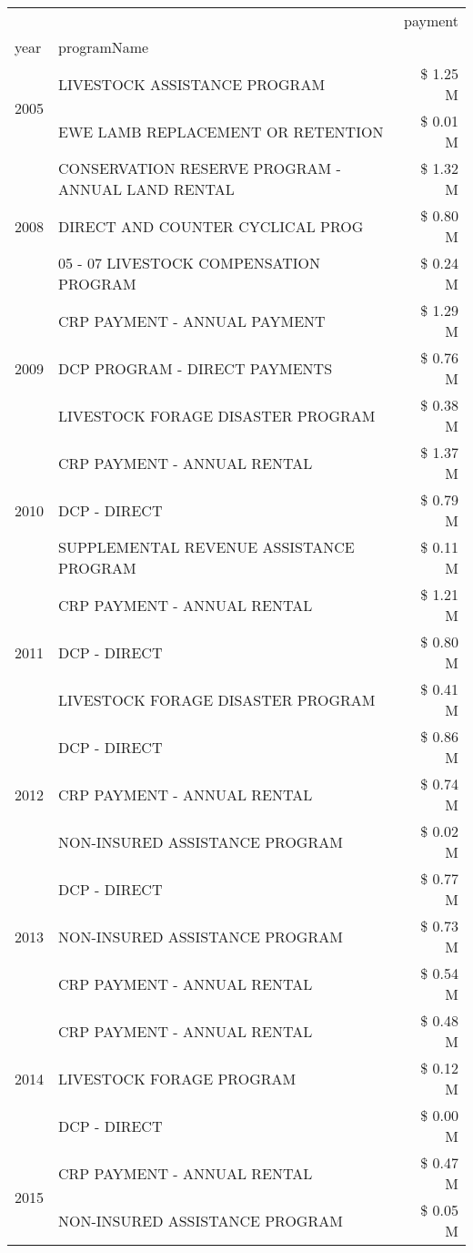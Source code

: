 \begin{tabular}{llr}
\toprule
 &  & payment \\
year & programName &  \\
\midrule
\multirow[t]{2}{*}{2005} & LIVESTOCK ASSISTANCE PROGRAM & \$ 1.25 M \\
 & EWE LAMB REPLACEMENT OR RETENTION & \$ 0.01 M \\
\cline{1-3}
\multirow[t]{3}{*}{2008} & CONSERVATION RESERVE PROGRAM - ANNUAL LAND RENTAL & \$ 1.32 M \\
 & DIRECT AND COUNTER CYCLICAL PROG & \$ 0.80 M \\
 & 05 - 07 LIVESTOCK COMPENSATION PROGRAM & \$ 0.24 M \\
\cline{1-3}
\multirow[t]{3}{*}{2009} & CRP PAYMENT - ANNUAL PAYMENT & \$ 1.29 M \\
 & DCP PROGRAM - DIRECT PAYMENTS & \$ 0.76 M \\
 & LIVESTOCK FORAGE DISASTER  PROGRAM & \$ 0.38 M \\
\cline{1-3}
\multirow[t]{3}{*}{2010} & CRP PAYMENT - ANNUAL RENTAL & \$ 1.37 M \\
 & DCP - DIRECT & \$ 0.79 M \\
 & SUPPLEMENTAL REVENUE ASSISTANCE PROGRAM & \$ 0.11 M \\
\cline{1-3}
\multirow[t]{3}{*}{2011} & CRP PAYMENT - ANNUAL RENTAL & \$ 1.21 M \\
 & DCP - DIRECT & \$ 0.80 M \\
 & LIVESTOCK FORAGE DISASTER PROGRAM & \$ 0.41 M \\
\cline{1-3}
\multirow[t]{3}{*}{2012} & DCP - DIRECT & \$ 0.86 M \\
 & CRP PAYMENT - ANNUAL RENTAL & \$ 0.74 M \\
 & NON-INSURED ASSISTANCE PROGRAM & \$ 0.02 M \\
\cline{1-3}
\multirow[t]{3}{*}{2013} & DCP - DIRECT & \$ 0.77 M \\
 & NON-INSURED ASSISTANCE PROGRAM & \$ 0.73 M \\
 & CRP PAYMENT - ANNUAL RENTAL & \$ 0.54 M \\
\cline{1-3}
\multirow[t]{3}{*}{2014} & CRP PAYMENT - ANNUAL RENTAL & \$ 0.48 M \\
 & LIVESTOCK FORAGE PROGRAM & \$ 0.12 M \\
 & DCP - DIRECT & \$ 0.00 M \\
\cline{1-3}
\multirow[t]{3}{*}{2015} & CRP PAYMENT - ANNUAL RENTAL & \$ 0.47 M \\
 & NON-INSURED ASSISTANCE PROGRAM & \$ 0.05 M \\

\end{tabular}
